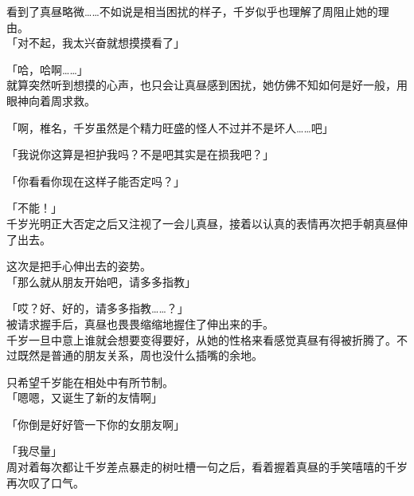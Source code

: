 看到了真昼略微……不如说是相当困扰的样子，千岁似乎也理解了周阻止她的理由。\\

「对不起，我太兴奋就想摸摸看了」

「哈，哈啊……」\\

就算突然听到想摸的心声，也只会让真昼感到困扰，她仿佛不知如何是好一般，用眼神向着周求救。

「啊，椎名，千岁虽然是个精力旺盛的怪人不过并不是坏人……吧」

「我说你这算是袒护我吗？不是吧其实是在损我吧？」

「你看看你现在这样子能否定吗？」

「不能！」\\

千岁光明正大否定之后又注视了一会儿真昼，接着以认真的表情再次把手朝真昼伸了出去。

这次是把手心伸出去的姿势。\\%

「那么就从朋友开始吧，请多多指教」

「哎？好、好的，请多多指教……？」\\

被请求握手后，真昼也畏畏缩缩地握住了伸出来的手。\\

千岁一旦中意上谁就会想要变得要好，从她的性格来看感觉真昼有得被折腾了。不过既然是普通的朋友关系，周也没什么插嘴的余地。

只希望千岁能在相处中有所节制。\\

「嗯嗯，又诞生了新的友情啊」

「你倒是好好管一下你的女朋友啊」

「我尽量」\\

周对着每次都让千岁差点暴走的树吐槽一句之后，看着握着真昼的手笑嘻嘻的千岁再次叹了口气。\\

